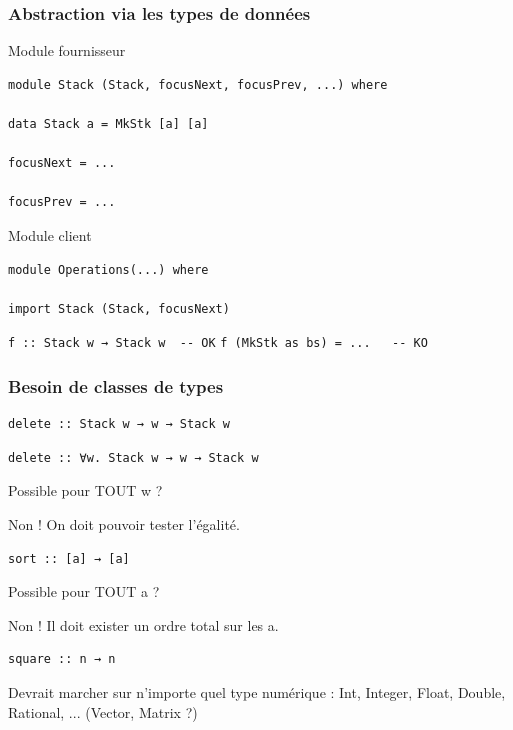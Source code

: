 \documentclass[10pt]{beamer}
\begin{document}
\begin{frame}[fragile]
\frametitle{Abstraction via les types de données}
\begin{block}
{Module fournisseur}
\begin{verbatim}
module Stack (Stack, focusNext, focusPrev, ...) where

data Stack a = MkStk [a] [a]

focusNext = ...

focusPrev = ...
\end{verbatim}
\end{block}
\pause
\begin{block}
{Module client}
\begin{verbatim}
module Operations(...) where

import Stack (Stack, focusNext)
\end{verbatim}
\pause
\verb|f :: Stack w → Stack w  -- OK|
\pause
\verb|f (MkStk as bs) = ...   -- KO|
\end{block}
\end{frame}



\begin{frame}[fragile]
\frametitle{Besoin de classes de types}
\begin{verbatim}
delete :: Stack w → w → Stack w
\end{verbatim}

\pause

\begin{verbatim}
delete :: ∀w. Stack w → w → Stack w
\end{verbatim}

Possible pour TOUT w ?

\pause

Non ! On doit pouvoir tester l'égalité.

\pause

\begin{verbatim}
sort :: [a] → [a]
\end{verbatim}

Possible pour TOUT a ?

\pause

Non ! Il doit exister un ordre total sur les a.

\pause

\begin{verbatim}
square :: n → n
\end{verbatim}

Devrait marcher sur n'importe quel type numérique : Int, Integer, Float,
Double, Rational, ... (Vector, Matrix ?)

\end{frame}
\end{document}
